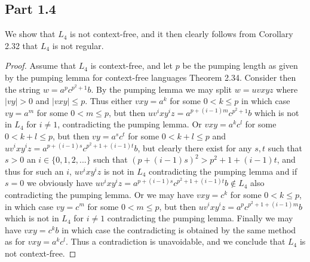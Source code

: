 \documentclass[a4paper,11pt]{article}
\newcommand{\abs}[1]{\left\lvert #1 \right\rvert}
\numberwithin{equation}{section}
\begin{document}
	\subsection*{Part 1.4}
	We show that $ L_4 $ is not context-free, and it then clearly follows from Corollary 2.32 that $ L_4 $ is not regular.
	\begin{proof}
		Assume that $ L_4 $ is context-free, and let $ p $ be the pumping length as given by the pumping lemma for context-free languages Theorem 2.34. Consider then the string $ w=a^pc^{p^2+1}b $. By the pumping lemma we may split $ w=uvxyz $ where $ \abs{vy}>0 $ and $ \abs{vxy}\leq p $. Thus either $ vxy=a^k $ for some $ 0<k\leq p $ in which case $ vy=a^m $ for some $ 0<m\leq p $, but then $ uv^ixy^iz=a^{p+(i-1)m}c^{p^2+1}b $ which is not in $ L_4 $ for $ i\neq 1 $, contradicting the pumping lemma. Or $ vxy=a^kc^l $ for some $ 0<k+l\leq p $, but then $ vy=a^sc^t $ for some $  0<k+l\leq p  $ and $ uv^ixy^iz=a^{p+(i-1)s}c^{p^2+1+(i-1)t}b  $, but clearly there exist for any $ s,t $ such that $ s>0 $ an $ i\in\{0,1,2,...\} $ such that $ (p+(i-1)s)^2>p^2+1+(i-1)t $, and thus for such an $ i $, $ uv^ixy^iz $ is not in $ L_4 $ contradicting the pumping lemma and if $ s=0 $ we obviously have $ uv^ixy^iz=a^{p+(i-1)s}c^{p^2+1+(i-1)t}b \notin L_4 $ also contradicting the pumping lemma. Or we may have $ vxy=c^k $ for some $ 0<k\leq p $, in which case $ vy=c^m $ for some $ 0<m\leq p $, but then $ uv^ixy^iz=a^pc^{p^2+1+(i-1)m}b $ which is not in $ L_4 $ for $ i\neq 1 $ contradicting the pumping lemma. Finally we may have $ vxy=c^kb $ in which case the contradicting is obtained by the same method as for $ vxy=a^kc^l $. Thus a contradiction is unavoidable, and we conclude that $ L_4 $ is not context-free.
	\end{proof}
	
\end{document}
